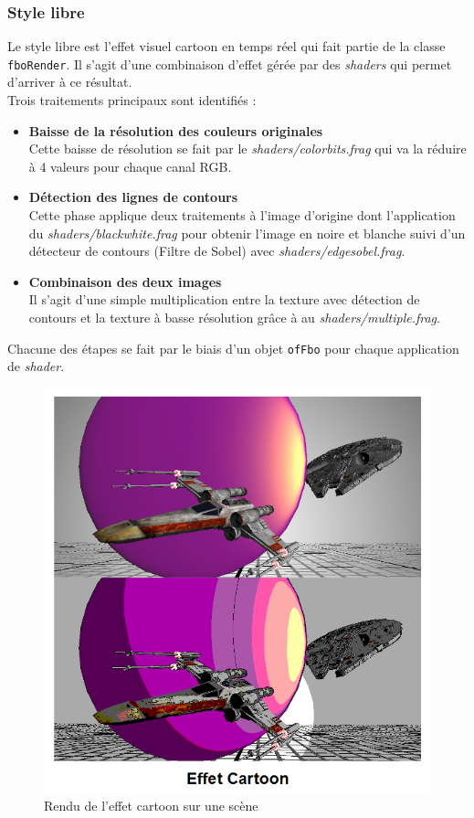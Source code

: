 \subsubsection{Style libre}

Le style libre est l'effet visuel cartoon en temps réel qui fait partie de la classe \texttt{fboRender}. Il s'agit d'une combinaison d'effet gérée par des \textit{shaders} qui permet d'arriver à ce résultat. \\

Trois traitements principaux sont identifiés :
\begin{itemize}
\item \textbf{Baisse de la résolution des couleurs originales}\\
Cette baisse de résolution se fait par le \textit{shaders/colorbits.frag} qui va la réduire à 4 valeurs pour chaque canal RGB.
\item \textbf{Détection des lignes de contours}\\
Cette phase applique deux traitements à l'image d'origine dont l'application du \textit{shaders/blackwhite.frag} pour obtenir l'image en noire et blanche suivi d'un détecteur de contours (Filtre de Sobel) avec \textit{shaders/edgesobel.frag}.
\item \textbf{Combinaison des deux images}\\
Il s'agit d'une simple multiplication entre la texture avec détection de contours et la texture à basse résolution grâce à au \textit{shaders/multiple.frag}. \\
\end{itemize}

Chacune des étapes se fait par le biais d'un objet \texttt{ofFbo} pour chaque application de \textit{shader}.


\begin{figure}[H]
    \centering
	\includegraphics[scale=1]{img/infog-image-effet-cartoon.png}
	\caption{Rendu de l'effet cartoon sur une scène}
	\label{fig:cartooneffect}
\end{figure}